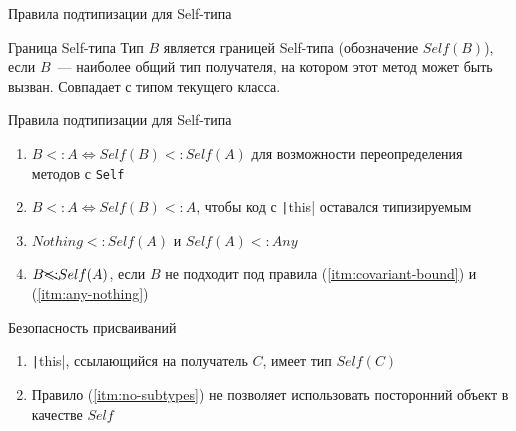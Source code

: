 \documentclass[usenames, dvipsnames]{beamer}
\begin{document}
    \begin{frame}[fragile]{Правила подтипизации для Self-типа}
        \begin{block}{Граница Self-типа}
            Тип $B$ является границей Self-типа (обозначение \underline{$Self(B)$}), если $B$~--- наиболее общий тип получателя, на котором этот метод может быть вызван.
            Совпадает с типом текущего класса.
        \end{block}

        \begin{block}{Правила подтипизации для Self-типа}
            \begin{enumerate}
                \item \label{itm:covariant-bound} $B <: A \iff Self(B) <: Self(A)$ для возможности переопределения методов с \texttt{Self}
                \item \label{itm:this-subtype} $B <: A \iff Self(B) <: A$, чтобы код с \texttt|this| оставался типизируемым
                \item \label{itm:any-nothing} $Nothing <: Self(A)$ и $Self(A) <: Any$
                \item \label{itm:no-subtypes} $B \bcancel{<:} Self(A)$, если $B$ не подходит под правила (\ref{itm:covariant-bound}) и (\ref{itm:any-nothing})
            \end{enumerate}
        \end{block}

        \begin{block}{Безопасность присваиваний}
            \begin{enumerate}
                \item \texttt|this|, ссылающийся на получатель $C$, имеет тип $Self(C)$
                \item Правило (\ref{itm:no-subtypes}) не позволяет использовать посторонний объект в качестве $Self$
            \end{enumerate}
        \end{block}
    \end{frame}
\end{document}
